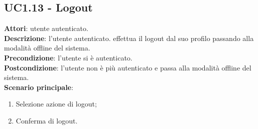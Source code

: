 \subsection{UC1.13 - Logout}{
	\label{uc1.13}
	\textbf{Attori}: utente autenticato.\\
	\textbf{Descrizione}: l'utente autenticato. effettua il logout dal suo profilo passando alla modalità offline del sistema.\\
	\textbf{Precondizione}: l'utente si è autenticato.\\
	\textbf{Postcondizione}: l'utente non è più autenticato e passa alla modalità offline del sistema.\\
	\textbf{Scenario principale}:
	\begin{enumerate}
		\item Selezione azione di logout;
		\item Conferma di logout.
	\end{enumerate}
}